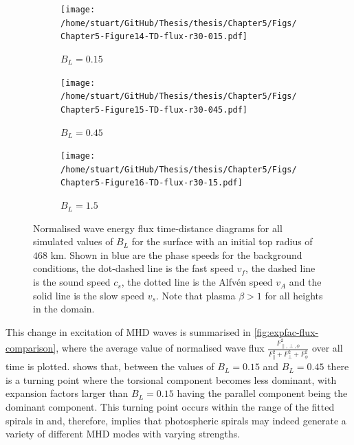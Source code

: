 \documentclass[a4paper,12pt,fourier,authoryear,custommargin]{Classes/PhDThesisPSnPDF}
\providecommand{\DIFaddtex}[1]{{\protect\color{blue}\uwave{#1}}} %
\providecommand{\DIFaddbegin}{} %
\providecommand{\DIFaddend}{} %
\providecommand{\DIFadd}[1]{\texorpdfstring{\DIFaddtex{#1}}{#1}} %
\begin{document}
\begin{figure}
    \centering
\ContinuedFloat


    \begin{subfigure}[b]{0.9\columnwidth}
        \texttt{[image: /home/stuart/GitHub/Thesis/thesis/Chapter5/Figs/Chapter5-Figure14-TD-flux-r30-015.pdf]}
        \caption{$B_L = 0.15$}
        \label{fig:TD-flux-r30-015}
    \end{subfigure}

    \begin{subfigure}[b]{0.9\columnwidth}
        \texttt{[image: /home/stuart/GitHub/Thesis/thesis/Chapter5/Figs/Chapter5-Figure15-TD-flux-r30-045.pdf]}
        \caption{$B_L = 0.45$}
        \label{fig:TD-flux-r30-045}
    \end{subfigure}
    \caption{}
    \label{fig:}
\end{figure}

\begin{figure}
    \centering
\ContinuedFloat


    \begin{subfigure}[b]{0.9\columnwidth}
        \texttt{[image: /home/stuart/GitHub/Thesis/thesis/Chapter5/Figs/Chapter5-Figure16-TD-flux-r30-15.pdf]}
        \caption{$B_L = 1.5$}
        \label{fig:TD-flux-r30-15}
    \end{subfigure}
    \caption{Normalised wave energy flux time-distance diagrams for all simulated values of $B_L$ for the surface with an initial top radius of $468$ km. Shown in blue are the phase speeds for the background conditions, the dot-dashed line is the fast speed $v_f$, the dashed line is the sound speed $c_s$, the dotted line is the Alfv\'en speed $v_A$ and the solid line is the slow speed $v_s$. Note that plasma $\beta > 1$ for all heights in the domain.}
    \label{fig:TD-flux-r30}
\end{figure}


This change in excitation of MHD waves is summarised in \cref{fig:expfac-flux-comparison}, where the average value of normalised wave flux $\displaystyle\frac{F_{\parallel, \perp, \phi}^2}{F_\parallel^2 + F_\perp^2 + F_\phi^2}$ over all time is plotted.
 shows that, between the values of $B_L=0.15$ and $B_L=0.45$ there is a turning point where the torsional component becomes less dominant, with expansion factors larger than $B_L=0.15$ having the parallel component being the dominant component.
This turning point occurs within the range of the fitted spirals in\DIFaddbegin \DIFadd{~}\DIFaddend \cite{bonet2008} and, therefore, implies that photospheric spirals may indeed generate a variety of different MHD modes with varying strengths.
\end{document}
